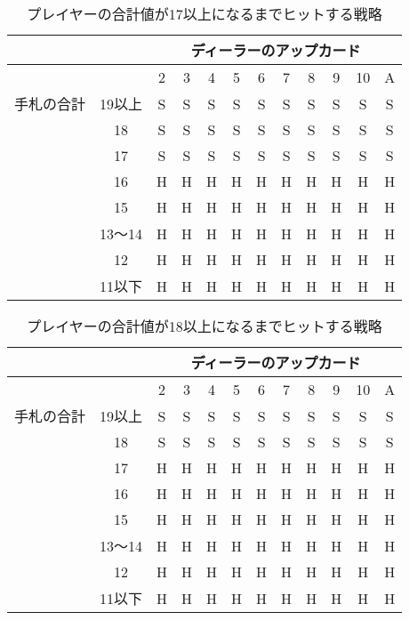 \begin{table}[H]
  \centering
  \caption{プレイヤーの合計値が17以上になるまでヒットする戦略\label{hitleq17}}
  \begin{tabular}{|c|c|c|c|c|c|c|c|c|c|c|c|}
    \hline
    \multicolumn{2}{|c|}{} & \multicolumn{10}{|c|}{ディーラーのアップカード} \\ \hline
    \multicolumn{2}{|c|}{} & 2 & 3 & 4 & 5 & 6 & 7 & 8 & 9 & 10 & A \\ \hline
    手札の合計 & 19以上 & S & S & S & S & S & S & S & S & S & S \\ \cline{3-12}
              & 18 & S & S & S & S & S & S & S & S & S & S \\ \cline{3-12}
              & 17 & S & S & S & S & S & S & S & S & S & S \\ \cline{3-12}
              & 16 & H & H & H & H & H & H & H & H & H & H \\ \cline{3-12}
              & 15 & H & H & H & H & H & H & H & H & H & H \\ \cline{3-12}
              & 13～14 & H & H & H & H & H & H & H & H & H & H \\ \cline{3-12}
              & 12 & H & H & H & H & H & H & H & H & H & H \\ \cline{3-12}
              & 11以下 & H & H & H & H & H & H & H & H & H & H \\ \hline
  \end{tabular}
\end{table}

\begin{table}[H]
  \centering
  \caption{プレイヤーの合計値が18以上になるまでヒットする戦略\label{hitleq18}}
  \begin{tabular}{|c|c|c|c|c|c|c|c|c|c|c|c|}
    \hline
    \multicolumn{2}{|c|}{} & \multicolumn{10}{|c|}{ディーラーのアップカード} \\ \hline
    \multicolumn{2}{|c|}{} & 2 & 3 & 4 & 5 & 6 & 7 & 8 & 9 & 10 & A \\ \hline
    手札の合計 & 19以上 & S & S & S & S & S & S & S & S & S & S \\ \cline{3-12}
              & 18 & S & S & S & S & S & S & S & S & S & S \\ \cline{3-12}
              & 17 & H & H & H & H & H & H & H & H & H & H \\ \cline{3-12}
              & 16 & H & H & H & H & H & H & H & H & H & H \\ \cline{3-12}
              & 15 & H & H & H & H & H & H & H & H & H & H \\ \cline{3-12}
              & 13～14 & H & H & H & H & H & H & H & H & H & H \\ \cline{3-12}
              & 12 & H & H & H & H & H & H & H & H & H & H \\ \cline{3-12}
              & 11以下 & H & H & H & H & H & H & H & H & H & H \\ \hline
  \end{tabular}
\end{table}

